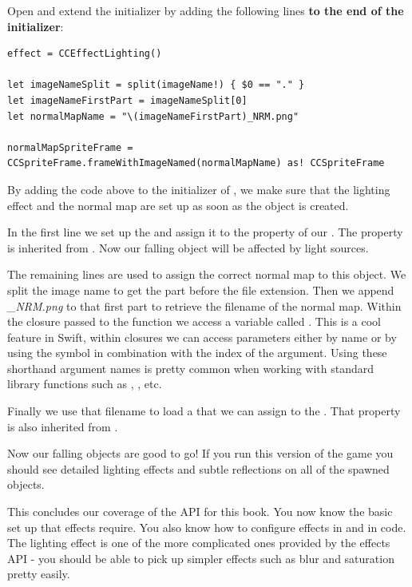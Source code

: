 \begin{leftbar}
Open  and extend the 
initializer by adding the following lines \textbf{to the end of the
initializer}:
\begin{lstlisting}
effect = CCEffectLighting()
    
let imageNameSplit = split(imageName!) { $0 == "." }
let imageNameFirstPart = imageNameSplit[0]
let normalMapName = "\(imageNameFirstPart)_NRM.png"

normalMapSpriteFrame = CCSpriteFrame.frameWithImageNamed(normalMapName) as! CCSpriteFrame
\end{lstlisting}
\end{leftbar}

By adding the code above to the initializer of , we
make sure that the lighting effect and the normal map are set up as soon as the
object is created.

In the first line we set up the  and assign it to
the  property of our . The
 property is inherited from . Now our
falling object will be affected by light sources.

The remaining lines are used to assign the correct normal map to this object. We
split the image name to get the part before the file extension. Then we append
\textit{\_NRM.png} to that first part to retrieve the filename of the normal
map. Within the closure passed to the  function we access a
variable called . This is a cool feature in Swift, within
closures we can access parameters either by name or by using the \inlinecode{\$}
symbol in combination with the index of the argument. Using these shorthand
argument names is pretty common when working with standard library functions
such as , , etc.

Finally we use that filename to load a  that we can
assign to the . That property is also inherited
from .

Now our falling objects are good to go! If you run this version of the game you
should see detailed lighting effects and subtle reflections on all of the
spawned objects.

This concludes our coverage of the  API for this book. You
now know the basic set up that effects require. You also know how to configure
effects in \SB{} and in code. The lighting effect is one of the more complicated
ones provided by the effects API - you should be able to pick up simpler effects
such as blur and saturation pretty easily.

